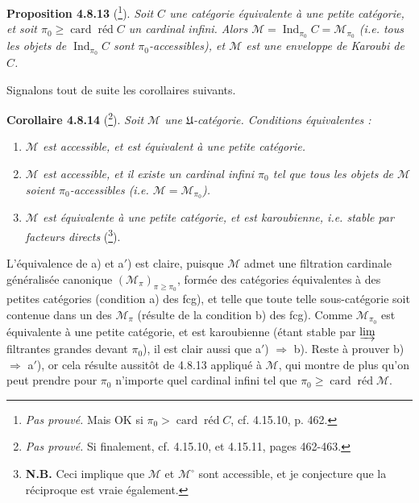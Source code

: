 \documentclass[11pt]{article}
\newcommand{\printedpage}[1]{\marginpar{\footnotesize p.~#1}}
\newcommand{\msp}[1]{\marginpar{\footnotesize [#1]}}
\newcommand{\Ind}{\operatorname{Ind}}
\newcommand{\card}{\operatorname{card}}
\newcommand{\red}{\operatorname{\text{réd}}}
\newcommand{\cM}{\mathcal{M}}
\begin{document}
\textbf{Proposition 4.8.13} (\footnote[89]{\textit{Pas prouvé.} Mais OK si $\pi_0 > \card\red C$, cf. 4.15.10, p. 462.}). \textit{Soit $C$ une catégorie équivalente à une petite catégorie, et soit $\pi_0 \geqslant \card\red C$ un cardinal infini. Alors $\cM = \Ind_{\pi_0}C = \cM_{\pi_0}$ (i.e. tous les objets de $\Ind_{\pi_0}C$ sont $\pi_0$-accessibles), et $\cM$ est une enveloppe de Karoubi de $C$.}

\msp{page 213}

Signalons tout de suite les corollaires suivants.

\textbf{Corollaire 4.8.14} (\footnote[90]{\textit{Pas prouvé.} Si finalement, cf. 4.15.10, et 4.15.11, pages 462-463.}). \textit{Soit $\cM$ une $\mathfrak{U}$-catégorie. Conditions équivalentes :}
\begin{enumerate}[leftmargin=*]
\item[\textit{a)}] \textit{$\cM$ est accessible, et est équivalent à une petite catégorie.}
\item[\textit{a$'$)}] \textit{$\cM$ est accessible, et il existe un cardinal infini $\pi_0$ tel que tous les objets de $\cM$ soient $\pi_0$-accessibles (i.e. $\cM = \cM_{\pi_0}$).}
\item[\textit{b)}] \textit{$\cM$ est équivalente à une petite catégorie, et est karoubienne, i.e. stable par facteurs directs} (\footnote[91]{\textbf{N.B.} Ceci implique que $\cM$ et $\cM^{\circ}$ sont accessible, et je conjecture que la réciproque est vraie également.}). %
\end{enumerate}

L'équivalence de a) et a$'$) est claire, puisque $\cM$ admet une filtration cardinale généralisée canonique $(\cM_{\pi})_{\pi\geqslant\pi_0}$, formée des catégories équivalentes à des petites catégories (condition
\printedpage{76}
a) des fcg), et telle que toute telle sous-catégorie soit contenue dans un des $\cM_{\pi}$ (résulte de la condition b) des fcg). Comme $\cM_{\pi_0}$ est équivalente à une petite catégorie, et est karoubienne (étant stable par $\varinjlim$ filtrantes grandes devant $\pi_0$), il est clair aussi que a$'$) $\Longrightarrow$ b). Reste à prouver b) $\Longrightarrow$ a$'$), or cela résulte aussitôt de 4.8.13 appliqué à $\cM$, qui montre de plus qu'on peut prendre pour $\pi_0$ n'importe quel cardinal infini tel que $\pi_0 \geqslant \card\red\cM$.
\end{document}
